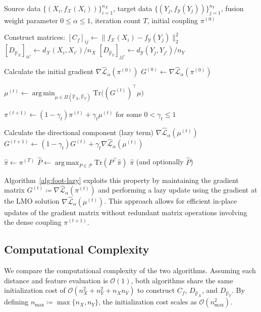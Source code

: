 \documentclass{article}
\theoremstyle{plain}
\theoremstyle{definition}
\theoremstyle{remark}
\DeclareMathOperator*{\argmin}{arg\,min}
\DeclareMathOperator*{\argmax}{arg\,max}
\begin{document}
\begin{algorithm}[t]
	\caption{Convex Distance Operator Transport Plan via FW and Optional LAP with Lazy Gradient Updates}
	\label{alg:foot-lazy}
	\begin{algorithmic}[1]
		 Source data $\{(X_i,f_{\mathcal{X}}(X_i))\}_{i=1}^{n_X}$, target data $\{(Y_j,f_{\mathcal{Y}}(Y_j))\}_{j=1}^{n_Y}$, fusion weight parameter $0 \leq \alpha \leq 1$, iteration count $T$, initial coupling $\pi^{(0)}$
		
		\STATE Construct matrices:
		\STATE $[C_f]_{ij} \gets \| f_{\mathcal{X}}(X_i) - f_{\mathcal{Y}}(Y_j) \|_2^2$
		\STATE $[D_{\hat{\mathbb{P}}_X}]_{ii'} \gets d_{\mathcal{X}}(X_i,X_{i'})/n_X$
		\STATE $[D_{\hat{\mathbb{P}}_Y}]_{jj'} \gets d_{\mathcal{Y}}(Y_j,Y_{j'})/n_Y$
		
		\STATE Calculate the initial gradient $\nabla \hat{\mathcal{L}}_{\alpha}(\pi^{(0)})$
		\STATE $G^{(0)} \gets \nabla \hat{\mathcal{L}}_{\alpha}(\pi^{(0)})$
		
		\STATE $\mu^{(t)} \gets \argmin_{\mu \in \Pi(\hat{\mathbb{P}}_X,\hat{\mathbb{P}}_Y)} \mathrm{Tr}\big((G^{(t)})^{\top}\mu\big)$
		
		\STATE $\pi^{(t+1)} \gets (1-\gamma_t)\pi^{(t)} + \gamma_t \mu^{(t)}$ for some $0 < \gamma_t \leq 1$
		
		\STATE Calculate the directional component (lazy term) $\nabla \hat{\mathcal{L}}_{\alpha}(\mu^{(t)})$
		\STATE $G^{(t+1)} \gets (1-\gamma_t)G^{(t)} + \gamma_t \nabla \hat{\mathcal{L}}_{\alpha}(\mu^{(t)})$ 
		\ENDIF
		\ENDFOR
		
		\STATE $\hat{\pi} \gets \pi^{(T)}$
		 $\hat{P} \gets \argmax_{P \in \mathcal{P}} \mathrm{Tr}(P^\top \hat\pi)$
		 $\hat{\pi}$ (and optionally $\hat{P}$)
	\end{algorithmic}
\end{algorithm}

Algorithm~\ref{alg:foot-lazy} exploits this property by maintaining the gradient matrix $G^{(t)} \coloneqq \nabla \hat{\mathcal{L}}_{\alpha}(\pi^{(t)})$ and performing a lazy update using the gradient at the LMO solution $\nabla \hat{\mathcal{L}}_{\alpha}(\mu^{(t)})$. This approach allows for efficient in-place updates of the gradient matrix without redundant matrix operations involving the dense coupling $\pi^{(t+1)}$.

\subsection{Computational Complexity}
We compare the computational complexity of the two algorithms. Assuming each distance and feature evaluation is $\mathcal{O}(1)$, both algorithms share the same initialization cost of $\mathcal{O}(n_X^2 + n_Y^2 + n_X n_Y)$ to construct $C_f$, $D_{\hat{\mathbb{P}}_X}$, and $D_{\hat{\mathbb{P}}_Y}$. By defining $n_{\max} \coloneqq \max\{n_X,n_Y\}$, the initialization cost scales as $\mathcal{O}(n_{\max}^2)$.
\end{document}
